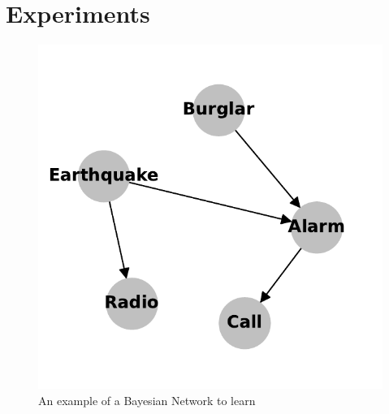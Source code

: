 \section{Experiments}
\begin{figure}[htp!]
    \centering
    \includegraphics[width=0.5\linewidth]{plots/alarm.pdf}
    \caption{An example of a Bayesian Network to learn}
    \label{fig:alarm_fig}
\end{figure}
